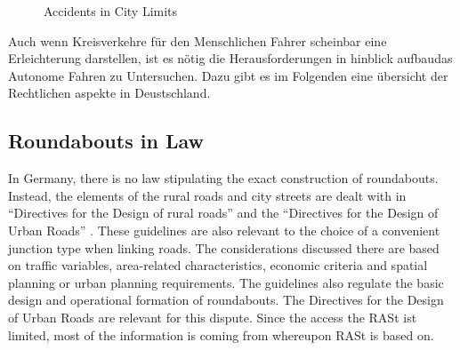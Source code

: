 \begin{figure}[!ht]
\caption{Accidents in City Limits \cite{Bondzio2012}}
\label{unfall_roundabout}
\end{figure}

Auch wenn Kreisverkehre für den Menschlichen Fahrer scheinbar eine Erleichterung darstellen, ist es nötig die Herausforderungen in hinblick aufbaudas Autonome Fahren zu Untersuchen.
Dazu gibt es im Folgenden eine übersicht der Rechtlichen aspekte in Deustschland.


\subsection{Roundabouts in Law}
%
In Germany, there is no law stipulating the exact construction of roundabouts.
Instead, the elements of the rural roads and city streets are dealt with in ``Directives for the Design of rural roads'' \cite{ral13}
and the ``Directives for the Design of Urban Roads''  \cite{rast06}. These guidelines are also relevant to the choice of a convenient junction type when linking roads.
The considerations discussed there are based on traffic variables, area-related characteristics, economic criteria and spatial planning or urban planning requirements. 
The guidelines also regulate the basic design and operational formation of roundabouts.
The  Directives for the Design of Urban Roads \cite{rast06} are relevant for this dispute. Since the access the RASt ist limited, most of the information is coming from
\cite{man06} whereupon RASt is based on.
